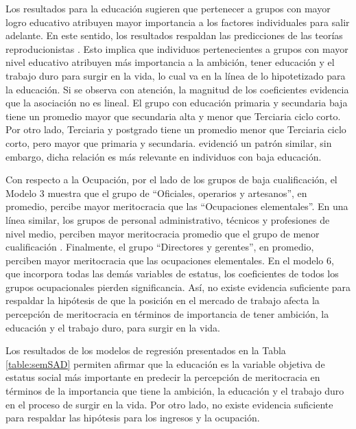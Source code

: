 \documentclass[12pt]{article}
\renewcommand{\baselinestretch}{1.5} %
\begin{document}
Los resultados para la educación sugieren que pertenecer a grupos con mayor logro educativo atribuyen mayor importancia a los factores individuales para salir adelante. En este sentido, los resultados respaldan las predicciones de las teorías reproducionistas \citep{Bernstein2003,Bourdieu1981}. Esto implica que individuos pertenecientes a grupos con mayor nivel educativo atribuyen más importancia a la ambición, tener educación y el trabajo duro para surgir en la vida, lo cual va en la línea de lo hipotetizado para la educación. Si se observa con atención, la magnitud de los coeficientes  evidencia que la asociación no es lineal. El grupo con educación primaria y secundaria baja tiene un promedio mayor que secundaria alta y menor que Terciaria ciclo corto. Por otro lado, Terciaria y postgrado tiene un promedio menor que Terciaria ciclo corto, pero mayor que primaria y secundaria. \cite{Sandoval2017} evidenció un patrón similar, sin embargo, dicha relación es más relevante en individuos con baja educación. 

Con respecto a la Ocupación, por el lado de los grupos de baja cualificación, el Modelo 3 muestra que el grupo de ``Oficiales, operarios y artesanos'', en promedio, percibe mayor meritocracia que las ``Ocupaciones elementales''. En una línea similar, los grupos de personal administrativo, técnicos y profesiones de nivel medio, perciben mayor meritocracia promedio que el grupo de menor cualificación . Finalmente, el grupo ``Directores y gerentes'', en promedio, perciben mayor meritocracia que las ocupaciones elementales. En el modelo 6, que incorpora todas las demás variables de estatus, los coeficientes de todos los grupos ocupacionales pierden significancia. Así, no existe evidencia suficiente para respaldar la hipótesis de que la posición en el mercado de trabajo afecta la percepción de meritocracia en términos de importancia de tener ambición, la educación y el trabajo duro, para surgir en la vida.

Los resultados de los modelos de regresión presentados en la Tabla \ref{table:semSAD} permiten afirmar que la educación es la variable objetiva de estatus social más importante en predecir la percepción de meritocracia en términos de la importancia que tiene la ambición, la educación y el trabajo duro en el proceso de surgir en la vida. Por otro lado, no existe evidencia suficiente para respaldar las hipótesis para los ingresos y la ocupación. 

\renewcommand{\arraystretch}{0.6}
\renewcommand{\baselinestretch}{1}

\restoregeometry
\end{document}
